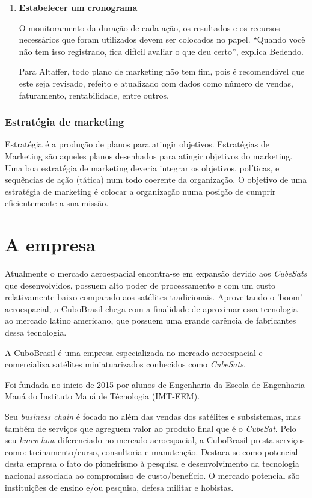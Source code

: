 \documentclass[
	12pt,				%
	openright,			%
	oneside,			%
	a4paper,			%
	english,			%
	french,				%
	spanish,			%
	brazil				%
	]{abntex2}
\begin{document}
\begin{enumerate}
		\item \textbf{Estabelecer um cronograma}
		
		O monitoramento da duração de cada ação, os resultados e os recursos necessários que foram utilizados devem ser colocados no papel. “Quando você não tem isso registrado, fica difícil avaliar o que deu certo”, explica Bedendo.
		
	Para Altaffer, todo plano de marketing não tem fim, pois é recomendável que este seja revisado, refeito e atualizado com dados como número de vendas, faturamento, rentabilidade, entre outros.
		
	\end{enumerate}

\subsection[Estratégia de marketing]{Estratégia de marketing}

	Estratégia é a produção de planos para atingir objetivos. Estratégias de Marketing são aqueles planos desenhados para atingir objetivos do marketing. Uma boa estratégia de marketing deveria integrar os objetivos, políticas, e sequências de ação (tática) num todo coerente da organização. O objetivo de uma estratégia de marketing é colocar a organização numa posição de cumprir eficientemente a sua missão.
	
\chapter[A empresa]{A empresa}

	Atualmente o mercado aeroespacial encontra-se em expansão devido aos \textit{CubeSats} que desenvolvidos, possuem alto poder de processamento e com um custo relativamente baixo comparado aos satélites tradicionais. Aproveitando o 'boom' aeroespacial, a CuboBrasil chega com a finalidade de aproximar essa tecnologia ao mercado latino americano, que possuem uma grande carência de fabricantes dessa tecnologia.
	
	A CuboBrasil é uma empresa especializada no mercado aeroespacial e comercializa satélites miniatuarizados conhecidos como \textit{CubeSats}. 
	
	Foi fundada no inicio de 2015 por alunos de Engenharia da Escola de Engenharia Mauá do Instituto Mauá de Técnologia (IMT-EEM). 
	
	Seu \textit{business chain} é focado no além das vendas dos satélites e subsistemas, mas também de serviços que agreguem valor ao produto final que é o \textit{CubeSat}. Pelo seu \textit{know-how} diferenciado no mercado aeroespacial, a CuboBrasil presta serviços como: treinamento/curso, consultoria e manutenção. Destaca-se como potencial desta empresa o fato do pioneirismo à pesquisa e desenvolvimento da tecnologia nacional associada ao compromisso de custo/benefício. O mercado potencial são instituições de ensino e/ou pesquisa, defesa militar e hobistas.
	
\end{document}
